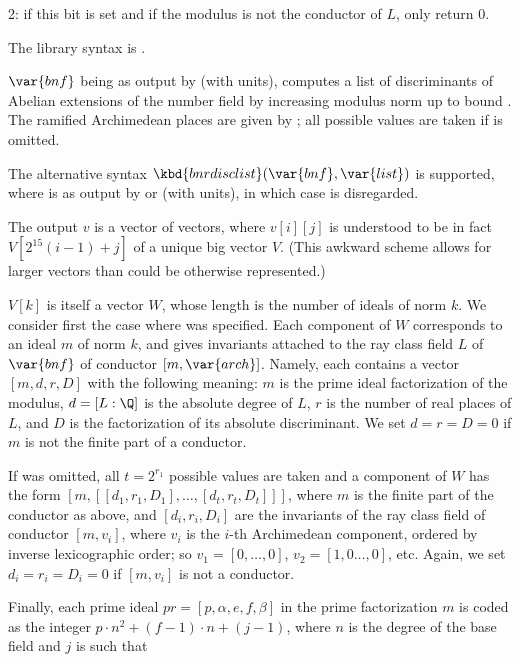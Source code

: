 \item 2: if this bit is set and if the modulus is not the conductor of $L$,
only return 0.

The library syntax is .

\label{se:bnrdisclist}
$\var{bnf}$ being as output by  (with units), computes a
list of discriminants of Abelian extensions of the number field by increasing
modulus norm up to bound . The ramified Archimedean places are
given by ; all possible values are taken if  is omitted.

The alternative syntax $\kbd{bnrdisclist}(\var{bnf},\var{list})$ is
supported, where  is as output by  or
 (with units), in which case  is disregarded.

The output $v$ is a vector of vectors, where $v[i][j]$ is understood to be in
fact $V[2^{15}(i-1)+j]$ of a unique big vector $V$. (This awkward scheme
allows for larger vectors than could be otherwise represented.)

$V[k]$ is itself a vector $W$, whose length is the number of ideals of norm
$k$. We consider first the case where  was specified. Each
component of $W$ corresponds to an ideal $m$ of norm $k$, and
gives invariants attached to the ray class field $L$ of $\var{bnf}$ of
conductor $[m, \var{arch}]$. Namely, each contains a vector $[m,d,r,D]$ with
the following meaning: $m$ is the prime ideal factorization of the modulus,
$d = [L:\Q]$ is the absolute degree of $L$, $r$ is the number of real places
of $L$, and $D$ is the factorization of its absolute discriminant. We set $d
= r = D = 0$ if $m$ is not the finite part of a conductor.

If  was omitted, all $t = 2^{r_1}$ possible values are taken and a
component of $W$ has the form $[m, [[d_1,r_1,D_1], \dots, [d_t,r_t,D_t]]]$,
where $m$ is the finite part of the conductor as above, and
$[d_i,r_i,D_i]$ are the invariants of the ray class field of conductor
$[m,v_i]$, where $v_i$ is the $i$-th Archimedean component, ordered by
inverse lexicographic order; so $v_1 = [0,\dots,0]$, $v_2 = [1,0\dots,0]$,
etc. Again, we set $d_i = r_i = D_i = 0$ if $[m,v_i]$ is not a conductor.

Finally, each prime ideal $pr = [p,\alpha,e,f,\beta]$ in the prime
factorization $m$ is coded as the integer $p\cdot n^2+(f-1)\cdot n+(j-1)$,
where $n$ is the degree of the base field and $j$ is such that

